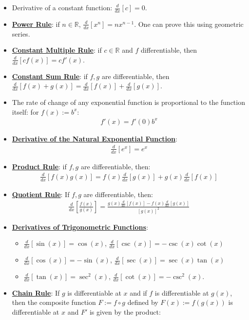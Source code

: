 \documentclass[reqno,11pt]{amsart}
\theoremstyle{definition}
\theoremstyle{remark}
\newcommand{\R}{\mathbb{R}}
\newcommand{\dfn}[1]{\underline{\textbf{#1}}}
\newcommand{\deriv}[1]{\frac{d}{dx} \left[ #1 \right]}
\begin{document}
\begin{itemize}[noitemsep]
	\item Derivative of a constant function: $\deriv{c} = 0$. 
	\item \dfn{Power Rule}: if $n \in \R$, $\deriv{x^n} = nx^{n-1}$. One can prove this using geometric series. 
	\item \dfn{Constant Multiple Rule}: if $c \in \R$ and $f$ differentiable, then $\deriv{cf(x)} = cf'(x)$. 
	\item \dfn{Constant Sum Rule}: if $f, g$ are differentiable, then $\deriv{f(x) + g(x)} = \deriv{f(x)} + \deriv{g(x)}$. 
	\item The rate of change of any exponential function is proportional to the function itself: for $f(x) := b^x$:
	\begin{align}
		f'(x) = f'(0) b^x	
	\end{align}
	\item \dfn{Derivative of the Natural Exponential Function}: 
	\begin{align}
		\deriv{e^x} = e^x 	
	\end{align}
	\item \dfn{Product Rule}: if $f, g$ are differentiable, then: 
	\begin{align}
		\deriv{f(x) g(x) } = f(x) \deriv{g(x)} + g(x) \deriv{f(x)} 	
	\end{align}
	\item \dfn{Quotient Rule}: If $f, g$ are differentiable, then: 
	\begin{align}
		\deriv{ \frac{f(x)}{g(x)} } = \frac{g(x) \deriv{f(x)} - f(x) \deriv{g(x)}}{[g(x)]^2}	
	\end{align}
	\item \dfn{Derivatives of Trigonometric Functions}: 
	\begin{itemize}[noitemsep]
		\item $\deriv{ \sin(x) } = \cos (x) $, $\deriv{ \csc(x) } = - \csc(x) \cot (x) $ 
		\item $\deriv{\cos(x) } = - \sin(x)$, $\deriv{\sec(x)} = \sec(x) \tan (x)$
		\item $\deriv{ \tan(x) } = \sec^2 (x)$, $ \deriv{\cot(x)} = - \csc^2 (x)$.
	\end{itemize}
	\item \dfn{Chain Rule}: If $g$ is differentiable at $x$ and if $f$ is differentiable at $g(x)$, then the composite function $F := f \circ g$ defined by $F(x) := f(g(x))$ is differentiable at $x$ and $F'$ is given by the product: 
	\begin{align}

\end{align}
\end{itemize}
\end{document}
